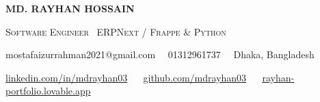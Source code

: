 \documentclass[a4paper,10pt]{article}
\newcommand{\dotsep}{\ \textperiodcentered\ }
\begin{document}
\begin{center}
  {\Huge\bfseries MD. RAYHAN HOSSAIN}\par\vspace{4pt}
  {\large\color{accent}\scshape Software Engineer \textbar\ ERPNext / Frappe \& Python}\par\vspace{6pt}
  {\small mostafaizurrahman2021@gmail.com \dotsep 01312961737 \dotsep Dhaka, Bangladesh}\par\vspace{2.5pt}
  {\small \href{https://www.linkedin.com/in/mdrayhan03/}{linkedin.com/in/mdrayhan03} \dotsep
          \href{https://github.com/mdrayhan03}{github.com/mdrayhan03} \dotsep
          \href{https://rayhan-portfolio.lovable.app}{rayhan-portfolio.lovable.app}}
\end{center}
\vspace{2pt}
\end{document}

